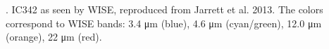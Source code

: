 \textbf{\label{fig:IC342}}. IC342 as seen by WISE, reproduced from Jarrett et al. 2013. The colors correspond to WISE bands: 3.4 μm (blue), 4.6 μm (cyan/green), 12.0 μm (orange), 22 μm (red).